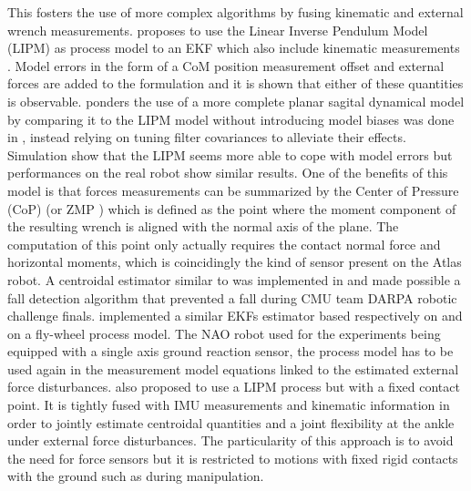 This fosters the use of more complex algorithms by fusing kinematic and external wrench measurements. \cite{stephens2011state} proposes to use the 
Linear Inverse Pendulum Model (LIPM) as process model to an EKF which also include kinematic measurements . Model errors in the form of a CoM position measurement offset and external forces are added to the formulation and it is shown that
either of these quantities is observable. \cite{atkeson2012state} ponders the use of a more complete planar sagital dynamical model by comparing it to the LIPM model
without introducing model biases was done in \cite{stephens2011state}, instead relying on tuning filter covariances to alleviate their effects. 
Simulation show that the LIPM seems more able to cope with model errors but performances on the real robot show similar results. 
One of the benefits of this model is that forces measurements can be summarized by the Center of Pressure (CoP) 
(or ZMP \cite{sardain2004forces}) which is defined as the point where the moment component of the resulting wrench is aligned with the normal axis of the plane.
The computation of this point only actually requires the contact normal force and horizontal moments, which is coincidingly the kind of
sensor present on the Atlas robot. A centroidal estimator similar to \cite{stephens2011state} was implemented in \cite{xinjilefu2015center} and made possible
a fall detection algorithm that prevented a fall during CMU team DARPA robotic challenge finals. \cite{piperakis2016non, piperakis2018nonlinear} implemented a similar 
EKFs estimator based respectively on and on a fly-wheel process model. The NAO robot used for the experiments being equipped with a single axis ground reaction sensor,
the process model has to be used again in the measurement model equations linked to the estimated external force disturbances.   
\cite{benallegue2015estimation} also proposed to use a LIPM process but with a fixed contact point. It is tightly fused with IMU 
measurements and kinematic information in order to jointly estimate centroidal quantities 
and a joint flexibility at the ankle under external force disturbances. The particularity of this approach is to avoid the need for force sensors but
it is restricted to motions with fixed rigid contacts with the ground such as during manipulation.


